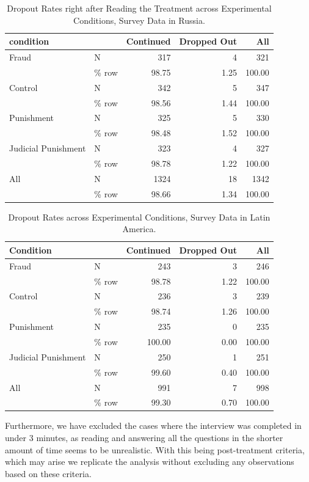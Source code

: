 \documentclass[11pt, ngerman,english,a4]{article}
\begin{document}
\begin{table}[H]
\centering
\caption{Dropout Rates right after Reading the Treatment across Experimental Conditions, Survey Data in Russia.} 
\begin{tabular}[t]{llrrr}
\toprule
condition &   & Continued & Dropped Out & All\\
\midrule
Fraud & N & 317 & 4 & 321\\
 & \% row & 98.75 & 1.25 & 100.00\\
Control & N & 342 & 5 & 347\\
 & \% row & 98.56 & 1.44 & 100.00\\
Punishment & N & 325 & 5 & 330\\
 & \% row & 98.48 & 1.52 & 100.00\\
Judicial Punishment & N & 323 & 4 & 327\\
 & \% row & 98.78 & 1.22 & 100.00\\
All & N & 1324 & 18 & 1342\\
 & \% row & 98.66 & 1.34 & 100.00\\
\bottomrule
\end{tabular}
\end{table}

\begin{table}[!htbp]
\centering
\caption{Dropout Rates across Experimental Conditions, Survey Data in Latin America.} 
\begin{tabular}[t]{llrrr}
\toprule
Condition &   & Continued & Dropped Out & All\\
\midrule
Fraud & N & 243 & 3 & 246\\
 & \% row & 98.78 & 1.22 & 100.00\\
Control & N & 236 & 3 & 239\\
 & \% row & 98.74 & 1.26 & 100.00\\
Punishment & N & 235 & 0 & 235\\
 & \% row & 100.00 & 0.00 & 100.00\\
Judicial Punishment & N & 250 & 1 & 251\\
 & \% row & 99.60 & 0.40 & 100.00\\
All & N & 991 & 7 & 998\\
 & \% row & 99.30 & 0.70 & 100.00\\
\bottomrule
\end{tabular}
\end{table}

\vspace{1cm}

Furthermore, we have excluded the cases where the interview was completed in under 3 minutes, as reading and answering all the questions in the shorter amount of time seems to be unrealistic. With this being post-treatment criteria, which may arise  we replicate the analysis without excluding any observations based on these criteria. 
\end{document}
